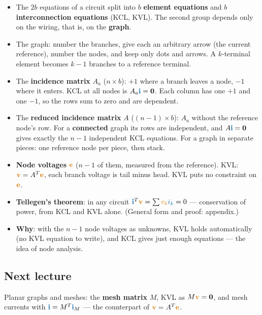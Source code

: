 \documentclass[11pt,a4paper]{article}
\newcommand{\Icol}[1]{\textcolor{ccur}{#1}}
\newcommand{\Vcol}[1]{\textcolor{cvolt}{#1}}
\begin{document}
\begin{itemize}
  \item The $2b$ equations of a circuit split into $b$ \textbf{element equations} and $b$
        \textbf{interconnection equations} (KCL, KVL). The second group depends only on the
        wiring, that is, on the \textbf{graph}.
  \item The graph: number the branches, give each an arbitrary arrow (the current
        reference), number the nodes, and keep only dots and arrows. A $k$-terminal element
        becomes $k-1$ branches to a reference terminal.
  \item The \textbf{incidence matrix} $A_a$ ($n \times b$): $+1$ where a branch leaves a
        node, $-1$ where it enters. KCL at all nodes is $A_a\Icol{\mathbf{i}} = \mathbf{0}$.
        Each column has one $+1$ and one $-1$, so the rows sum to zero and are dependent.
  \item The \textbf{reduced incidence matrix} $A$ ($(n-1) \times b$): $A_a$ without the
        reference node's row. For a \textbf{connected} graph its rows are independent, and
        $A\Icol{\mathbf{i}} = \mathbf{0}$ gives exactly the $n-1$ independent KCL equations.
        For a graph in separate pieces: one reference node per piece, then stack.
  \item \textbf{Node voltages} $\Vcol{\mathbf{e}}$ ($n-1$ of them, measured from the
        reference). KVL: $\Vcol{\mathbf{v}} = A^T\Vcol{\mathbf{e}}$, each branch voltage is
        tail minus head. KVL puts no constraint on $\Vcol{\mathbf{e}}$.
  \item \textbf{Tellegen's theorem}: in any circuit
        $\Icol{\mathbf{i}}^T\Vcol{\mathbf{v}} = \sum \Vcol{v_k}\Icol{i_k} = 0$ ---
        conservation of power, from KCL and KVL alone. (General form and proof: appendix.)
  \item \textbf{Why}: with the $n-1$ node voltages as unknowns, KVL holds automatically (no
        KVL equation to write), and KCL gives just enough equations --- the idea of node
        analysis.
\end{itemize}

\subsection*{Next lecture}
Planar graphs and meshes: the \textbf{mesh matrix} $M$, KVL as $M\Vcol{\mathbf{v}} =
\mathbf{0}$, and mesh currents with $\Icol{\mathbf{i}} = M^T\Icol{\mathbf{i}}_M$ --- the
counterpart of $\Vcol{\mathbf{v}} = A^T\Vcol{\mathbf{e}}$.
\end{document}
